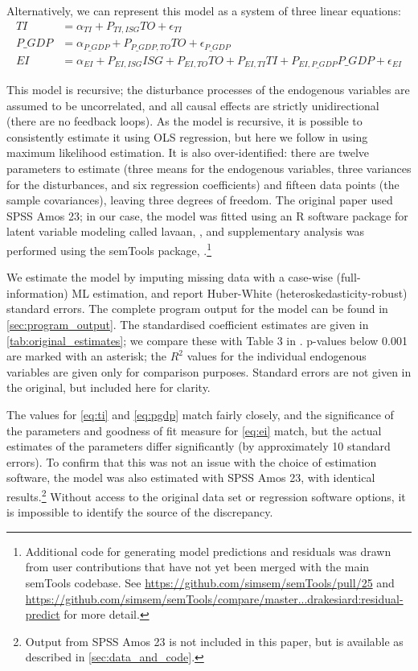 \documentclass[11pt,a4paper]{article}
\newcommand{\pkg}[1]{{\fontseries{b}\selectfont #1}}
\begin{document}
Alternatively, we can represent this model as a system of three linear equations:
\begin{align}
TI &= \alpha_{TI} + P_{TI,ISG} TO + \epsilon_{TI} \label{eq:ti}\\
P\_GDP &= \alpha_{P\_GDP} + P_{P\_GDP,TO} TO + \epsilon_{P\_GDP} \label{eq:pgdp}\\
EI &= \alpha_{EI} + P_{EI,ISG} ISG + P_{EI,TO} TO + P_{EI,TI} TI + P_{EI,P\_GDP} P\_GDP + \epsilon_{EI} \label{eq:ei}
\end{align}

This model is recursive; the disturbance processes of the endogenous variables are assumed to be uncorrelated, and all causal effects are strictly unidirectional (there are no feedback loops).
As the model is recursive, it is possible to consistently estimate it using OLS regression, but here we follow \cite{panHowIndustrializationTrade2019} in using maximum likelihood estimation.
It is also over-identified: there are twelve parameters to estimate (three means for the endogenous variables, three variances for the disturbances, and six regression coefficients) and fifteen data points (the sample covariances), leaving three degrees of freedom.
The original paper used SPSS Amos 23; in our case, the model was fitted using an R software package for latent variable modeling called \pkg{lavaan}, \cite{rosseelLavaanPackageStructural2012}, and supplementary analysis was performed using the \pkg{semTools} package, \cite{jorgensenSemToolsUsefulTools2019}.\footnote{
Additional code for generating model predictions and residuals was drawn from user contributions that have not yet been merged with the main \pkg{semTools} codebase.
See \url{https://github.com/simsem/semTools/pull/25} and \url{https://github.com/simsem/semTools/compare/master...drakesiard:residual-predict} for more detail.
}

We estimate the model by imputing missing data with a case-wise (full-information) ML estimation, and report Huber-White (heteroskedasticity-robust) standard errors. 
The complete program output for the model can be found in \cref{sec:program_output}.
The standardised coefficient estimates are given in \cref{tab:original_estimates}; we compare these with Table 3 in \cite{panHowIndustrializationTrade2019}.
p-values below 0.001 are marked with an asterisk; the $R^{2}$ values for the individual endogenous variables are given only for comparison purposes.
Standard errors are not given in the original, but included here for clarity.

The values for \cref{eq:ti} and \cref{eq:pgdp} match fairly closely, and the significance of the parameters and goodness of fit measure for \cref{eq:ei} match, but the actual estimates of the parameters differ significantly (by approximately 10 standard errors).
To confirm that this was not an issue with the choice of estimation software, the model was also estimated with SPSS Amos 23, with identical results.\footnote{
Output from SPSS Amos 23 is not included in this paper, but is available as described in \cref{sec:data_and_code}.}
Without access to the original data set or regression software options, it is impossible to identify the source of the discrepancy.
\end{document}
